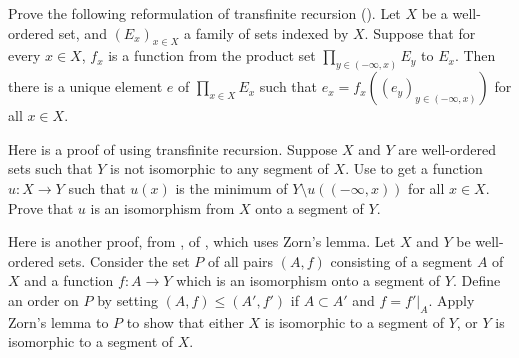 \documentclass{article}
\begin{document}
\begin{exercise}
  \label{exe:oh59gz4i}
  Prove the following reformulation of transfinite recursion
  ().  Let \(X\) be a well-ordered set, and
  \((E_x)_{x \in X}\) a family of sets indexed by \(X\).  Suppose that
  for every \(x \in X\), \(f_x\) is a function from the product set
  \(\prod_{y \in (-\infty, x)} E_y\) to \(E_x\).  Then there is a
  unique element \(e\) of \(\prod_{x \in X} E_x\) such that
  \(e_x = f_x((e_y)_{y \in (-\infty, x)})\) for all \(x \in X\).
\end{exercise}

\begin{exercise}
  \label{exe:eghnwow2}
  Here is a proof of  using transfinite recursion.
  Suppose \(X\) and \(Y\) are well-ordered sets such that \(Y\) is not
  isomorphic to any segment of \(X\).  Use  to
  get a function \(u : X \to Y\) such that \(u(x)\) is the minimum of
  \(Y \setminus u((-\infty, x))\) for all \(x \in X\).  Prove that
  \(u\) is an isomorphism from \(X\) onto a segment of \(Y\).
\end{exercise}

\begin{exercise}
  \label{exe:vgms7ihx}
  Here is another proof, from \textcite[\S2.5,
  Theorem~3]{bib:lmhdqwpw}, of , which uses Zorn's
  lemma.  Let \(X\) and \(Y\) be well-ordered sets.  Consider the set
  \(P\) of all pairs \((A,f)\) consisting of a segment \(A\) of \(X\)
  and a function \(f : A \to Y\) which is an isomorphism onto a
  segment of \(Y\).  Define an order on \(P\) by setting
  \((A,f) \leq (A',f')\) if \(A \subset A'\) and \(f = f' \vert_A\).
  Apply Zorn's lemma to \(P\) to show that either \(X\) is isomorphic
  to a segment of \(Y\), or \(Y\) is isomorphic to a segment of \(X\).
\end{exercise}
\end{document}
